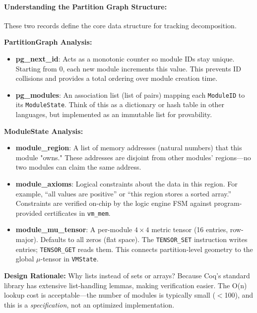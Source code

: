 \paragraph{Understanding the Partition Graph Structure:} These two records define the core data structure for tracking decomposition.

\textbf{PartitionGraph Analysis:}
\begin{itemize}
    \item \textbf{pg\_next\_id}: Acts as a monotonic counter so module IDs stay unique. Starting from 0, each new module increments this value. This prevents ID collisions and provides a total ordering over module creation time.
    \item \textbf{pg\_modules}: An association list (list of pairs) mapping each \texttt{ModuleID} to its \texttt{ModuleState}. Think of this as a dictionary or hash table in other languages, but implemented as an immutable list for provability.
\end{itemize}

\textbf{ModuleState Analysis:}
\begin{itemize}
    \item \textbf{module\_region}: A list of memory addresses (natural numbers) that this module "owns." These addresses are disjoint from other modules' regions—no two modules can claim the same address.
    \item \textbf{module\_axioms}: Logical constraints about the data in this region. For example, ``all values are positive'' or ``this region stores a sorted array.'' Constraints are verified on-chip by the logic engine FSM against program-provided certificates in \texttt{vm\_mem}.
    \item \textbf{module\_mu\_tensor}: A per-module $4 \times 4$ metric tensor (16 entries, row-major). Defaults to all zeros (flat space). The \texttt{TENSOR\_SET} instruction writes entries; \texttt{TENSOR\_GET} reads them. This connects partition-level geometry to the global $\mu$-tensor in \texttt{VMState}.
\end{itemize}

\textbf{Design Rationale:} Why lists instead of sets or arrays? Because Coq's standard library has extensive list-handling lemmas, making verification easier. The O(n) lookup cost is acceptable---the number of modules is typically small ($<$100), and this is a \emph{specification}, not an optimized implementation.

